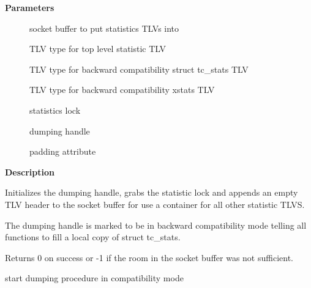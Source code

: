 \documentclass[a4paper,8pt,english]{sphinxmanual}
\begin{document}
\textbf{Parameters}
\begin{description}
\item[{}] \leavevmode
socket buffer to put statistics TLVs into

\item[{}] \leavevmode
TLV type for top level statistic TLV

\item[{}] \leavevmode
TLV type for backward compatibility struct tc\_stats TLV

\item[{}] \leavevmode
TLV type for backward compatibility xstats TLV

\item[{}] \leavevmode
statistics lock

\item[{}] \leavevmode
dumping handle

\item[{}] \leavevmode
padding attribute

\end{description}

\textbf{Description}

Initializes the dumping handle, grabs the statistic lock and appends
an empty TLV header to the socket buffer for use a container for all
other statistic TLVS.

The dumping handle is marked to be in backward compatibility mode telling
all  functions to fill a local copy of struct tc\_stats.

Returns 0 on success or -1 if the room in the socket buffer was not sufficient.

\begin{fulllineitems}
\label{networking/kapi:c.gnet_stats_start_copy}
start dumping procedure in compatibility mode

\end{fulllineitems}
\end{document}
